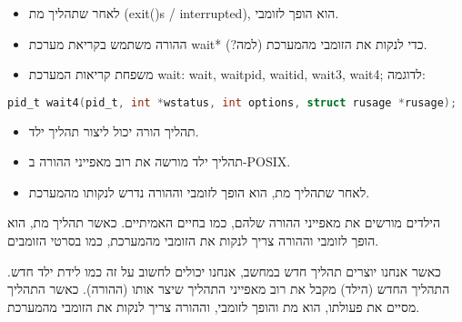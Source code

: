 \documentclass[12pt]{report}
\begin{document}
\begin{itemize}
\item לאחר שתהליך מת (exit()s / interrupted), הוא הופך לזומבי.
\item ההורה משתמש בקריאת מערכת wait* כדי לנקות את הזומבי מהמערכת (למה?).
\item משפחת קריאות המערכת wait: wait, waitpid, waitid, wait3, wait4; לדוגמה:
\end{itemize}
\begin{lstlisting}[language=C]
pid_t wait4(pid_t, int *wstatus, int options, struct rusage *rusage);
\end{lstlisting}
\begin{tcolorbox}[colback=yellow!5, colframe=yellow!80!black, title={\faBookmark נקודות מפתח}]
\begin{itemize}
\item תהליך הורה יכול ליצור תהליך ילד.
\item תהליך ילד מורשה את רוב מאפייני ההורה ב-POSIX.
\item לאחר שתהליך מת, הוא הופך לזומבי וההורה נדרש לנקותו מהמערכת.
\end{itemize}
\end{tcolorbox}
\begin{tcolorbox}[colback=green!5, colframe=green!75!black, title={\faLightbulb אינטואיציה}]
הילדים מורשים את מאפייני ההורה שלהם, כמו בחיים האמיתיים. כאשר תהליך מת, הוא הופך לזומבי וההורה צריך לנקות את הזומבי מהמערכת, כמו בסרטי הזומבים.
\end{tcolorbox}
\begin{tcolorbox}[colback=blue!5, colframe=blue!75!black, title={\faLightbulb הסבר פשוט}]
כאשר אנחנו יוצרים תהליך חדש במחשב, אנחנו יכולים לחשוב על זה כמו לידת ילד חדש. התהליך החדש (הילד) מקבל את רוב מאפייני התהליך שיצר אותו (ההורה). כאשר התהליך מסיים את פעולתו, הוא מת והופך לזומבי, וההורה צריך לנקות את הזומבי מהמערכת.
\end{tcolorbox}
\end{document}
